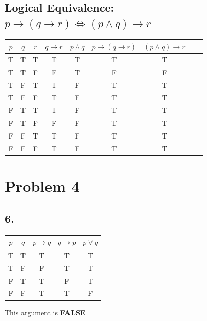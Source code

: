 \documentclass[a4paper, 10pt]{article}
\begin{document}
        \subsection{Logical Equivalence: \( p \rightarrow (q \rightarrow r) \Leftrightarrow (p \land q) \rightarrow r \)}
            \begin{tabular}{|c|c|c|c|c|c|c|c|c|}
                \hline
                $p$ & $q$ & $r$ & $q \rightarrow r$ & $p \land q$ & $p \rightarrow (q \rightarrow r)$ & $(p \land q) \rightarrow r$ \\ \hline
                T & T & T & T & T & T & T \\ \hline
                T & T & F & F & T & F & F \\ \hline
                T & F & T & T & F & T & T \\ \hline
                T & F & F & T & F & T & T \\ \hline
                F & T & T & T & F & T & T \\ \hline
                F & T & F & F & F & T & T \\ \hline
                F & F & T & T & F & T & T \\ \hline
                F & F & F & T & F & T & T \\ \hline
            \end{tabular}

    \pagebreak
    \section{Problem 4}
        \subsection*{6.}
            \begin{tabular}{|c|c|c|c|c|}
                \hline
                $p$ & $q$ & \cellcolor{yellow}$p \rightarrow q$ & \cellcolor{yellow}$q \rightarrow p$ & \cellcolor{orange}$p \lor q$ \\
                \hline
                \rowcolor{lightgray} T & T & T & T & T \\
                T & F & F & T & T \\
                F & T & T & F & T \\
                \rowcolor{lightgray} F & F & T & T & F \\
                \hline
            \end{tabular}

            This argument is \textbf{FALSE}
\end{document}
